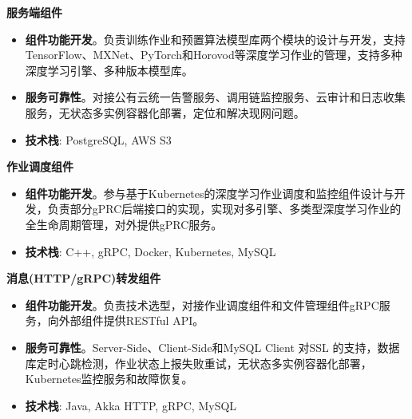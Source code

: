\documentclass{resume}
\begin{document}
\begin{onehalfspacing}
\textbf{服务端组件}    
\begin{itemize}%
  \item \textbf{组件功能开发}。负责训练作业和预置算法模型库两个模块的设计与开发，支持TensorFlow、MXNet、PyTorch和Horovod等深度学习作业的管理，支持多种深度学习引擎、多种版本模型库。%
  \item \textbf{服务可靠性}。对接公有云统一告警服务、调用链监控服务、云审计和日志收集服务，无状态多实例容器化部署，定位和解决现网问题。
  \item \textbf{技术栈}: PostgreSQL, AWS S3
\end{itemize}

\begin{onehalfspacing}
\textbf{作业调度组件}  
\begin{itemize}%
  \item \textbf{组件功能开发}。参与基于Kubernetes的深度学习作业调度和监控组件设计与开发，负责部分gPRC后端接口的实现，实现对多引擎、多类型深度学习作业的全生命周期管理，对外提供gPRC服务。
  \item \textbf{技术栈}: C++, gRPC, Docker, Kubernetes, MySQL
\end{itemize}

\begin{onehalfspacing}
\textbf{消息(HTTP/gRPC)转发组件}  
\begin{itemize}%
  \item \textbf{组件功能开发}。负责技术选型，对接作业调度组件和文件管理组件gRPC服务，向外部组件提供RESTful API。
  \item \textbf{服务可靠性}。Server-Side、Client-Side和MySQL Client 对SSL 的支持，数据库定时心跳检测，作业状态上报失败重试，无状态多实例容器化部署，Kubernetes监控服务和故障恢复。
  \item \textbf{技术栈}: Java, Akka HTTP, gRPC, MySQL
\end{itemize}
\end{onehalfspacing}

\end{onehalfspacing}

\end{onehalfspacing}


\end{document}

